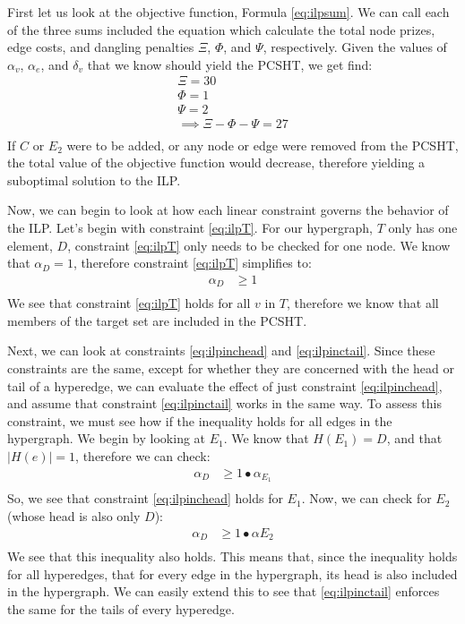 \documentclass[12pt,twoside]{reedthesis}
\theoremstyle{definition}
\begin{document}
First let us look at the objective function, Formula \eqref{eq:ilpsum}. We can call each of the three sums included the equation which calculate the total node prizes, edge costs, and dangling penalties $\Xi$, $\Phi$, and $\Psi$, respectively. Given the values of $\alpha_v$, $\alpha_e$, and $\delta_v$ that we know should yield the PCSHT, we get find:
\begin{gather*}
 \Xi = 30\\
 \Phi = 1\\
 \Psi = 2\\
 \implies \Xi - \Phi - \Psi = 27\\
\end{gather*}%
If $C$ or $E_2$ were to be added, or any node or edge were removed from the PCSHT, the total value of the objective function would decrease, therefore yielding a suboptimal solution to the ILP.\par

Now, we can begin to look at how each linear constraint governs the behavior of the ILP. Let's begin with constraint \eqref{eq:ilpT}. For our hypergraph, $T$ only has one element, $D$, constraint \eqref{eq:ilpT} only needs to be checked for one node. We know that $\alpha_D = 1$, therefore constraint \eqref{eq:ilpT} simplifies to:
\begin{align*}
  \alpha_D &\geq 1\\
\end{align*}
We see that constraint \eqref{eq:ilpT} holds for all $v$ in $T$, therefore we know that all members of the target set are included in the PCSHT.\par

Next, we can look at constraints \eqref{eq:ilpinchead} and \eqref{eq:ilpinctail}. Since these constraints are the same, except for whether they are concerned with the head or tail of a hyperedge, we can evaluate the effect of just constraint \eqref{eq:ilpinchead}, and assume that constraint \eqref{eq:ilpinctail} works in the same way. To assess this constraint, we must see how if the inequality holds for all edges in the hypergraph. We begin by looking at $E_1$. We know that $H({E_1})=D$, and that $\lvert H(e) \rvert = 1$, therefore we can check:
\begin{align*}
  \alpha_D &\geq 1 \bullet \alpha_{E_1}\\
\end{align*}%
So, we see that constraint \eqref{eq:ilpinchead} holds for $E_1$. Now, we can check for $E_2$ (whose head is also only $D$):
\begin{align*}
  \alpha_D &\geq 1 \bullet \alpha{E_2}\\
\end{align*}%
We see that this inequality also holds. This means that, since the inequality holds for all hyperedges, that for every edge in the hypergraph, its head is also included in the hypergraph. We can easily extend this to see that \eqref{eq:ilpinctail} enforces the same for the tails of every hyperedge.\par
\end{document}
